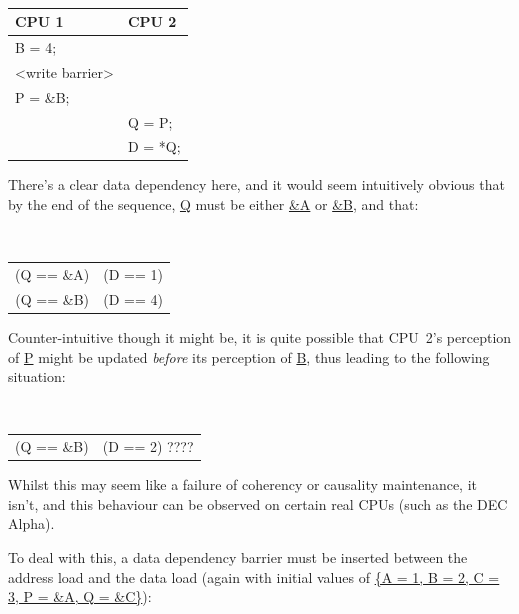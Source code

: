 \vspace{5pt}
\begin{minipage}[t]{\columnwidth}
\tt
\begin{tabular}{l|l}
	CPU 1 &		CPU 2 \\
	\hline
	B = 4; & \\
	<write barrier> & \\
	P = \&B; &	\\
		&	Q = P; \\
		&	D = *Q; \\
\end{tabular}
\end{minipage}
\vspace{5pt}

There's a clear data dependency here, and it would seem intuitively
obvious that by the end of the sequence, \url{Q} must be either \url{&A}
or \url{&B}, and that:

\vspace{5pt}
\begin{minipage}[t]{\columnwidth}
\tt
\begin{tabular}{c@{ implies }c}
	(Q == \&A) & (D == 1) \\
	(Q == \&B) & (D == 4) \\
\end{tabular}
\end{minipage}
\vspace{5pt}

Counter-intuitive though it might be, it is quite possible that
CPU~2's perception of \url{P} might be updated \emph{before} its perception
of \url{B}, thus leading to the following situation:

\vspace{5pt}
\begin{minipage}[t]{\columnwidth}
\tt
\begin{tabular}{c@{ and }c}
	(Q == \&B) & (D == 2) ???? \\
\end{tabular}
\end{minipage}
\vspace{5pt}

Whilst this may seem like a failure of coherency or causality maintenance, it
isn't, and this behaviour can be observed on certain real CPUs (such as the DEC
Alpha).

To deal with this, a data dependency barrier must be inserted between the
address load and the data load (again with initial values of
\url{{A = 1, B = 2, C = 3, P = &A, Q = &C}}):


